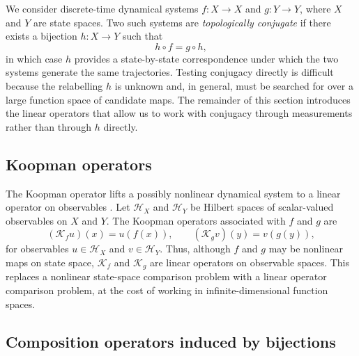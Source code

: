 \documentclass{article}
\theoremstyle{definition}
\begin{document}
We consider discrete-time dynamical systems \(f:X\to X\) and \(g:Y\to Y\), where \(X\) and \(Y\) are state spaces. Two such systems are \emph{topologically conjugate} if there exists a bijection $h: X \to Y$ such that
\begin{equation}
\label{eq:spatial_conjugacy}
    h\circ f = g\circ h ,
\end{equation}
in which case $h$ provides a state-by-state correspondence under which the two systems generate the same trajectories. Testing conjugacy directly is difficult because the relabelling \(h\) is unknown and, in general, must be searched for over a large function space of candidate maps. The remainder of this section introduces the linear operators that allow us to work with conjugacy through measurements rather than through $h$ directly.


\subsection{Koopman operators}
\label{sec:bg-koopman}

The Koopman operator lifts a possibly nonlinear dynamical system to a linear operator on observables \citep{koopman1931hamiltonian}. Let \(\mathcal H_X\) and \(\mathcal H_Y\) be Hilbert spaces of scalar-valued observables on \(X\) and \(Y\). The Koopman operators associated with \(f\) and \(g\) are
\[
    (\mathcal K_f u)(x)=u(f(x)), \qquad
    (\mathcal K_g v)(y)=v(g(y)),
\]
for observables \(u\in\mathcal H_X\) and \(v\in\mathcal H_Y\). Thus, although \(f\) and \(g\) may be nonlinear maps on state space, \(\mathcal K_f\) and \(\mathcal K_g\) are linear operators on observable spaces. This replaces a nonlinear state-space comparison problem with a linear operator comparison problem, at the cost of working in infinite-dimensional function spaces.


\subsection{Composition operators induced by bijections}
\label{sec:bg-composition}
\end{document}

